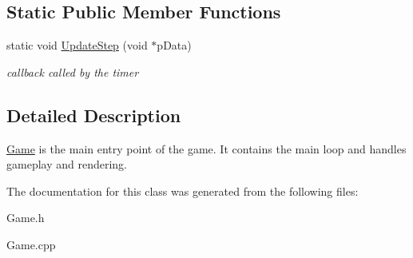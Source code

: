 \subsection*{Static Public Member Functions}
\begin{DoxyCompactItemize}
\item 
\hypertarget{class_game_a8a449b33a6bc286c427366a2657e1764}{static void \hyperlink{class_game_a8a449b33a6bc286c427366a2657e1764}{Update\-Step} (void $\ast$p\-Data)}\label{class_game_a8a449b33a6bc286c427366a2657e1764}

\begin{DoxyCompactList}\small\item\em callback called by the timer \end{DoxyCompactList}\end{DoxyCompactItemize}


\subsection{Detailed Description}
\hyperlink{class_game}{Game} is the main entry point of the game. It contains the main loop and handles gameplay and rendering. 

The documentation for this class was generated from the following files\-:\begin{DoxyCompactItemize}
\item 
Game.\-h\item 
Game.\-cpp\end{DoxyCompactItemize}
